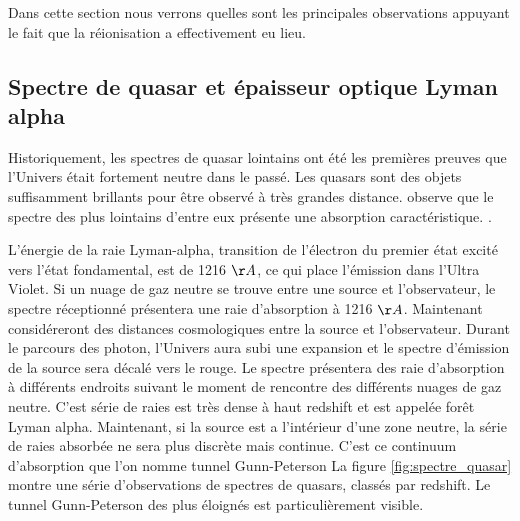 Dans cette section nous verrons quelles sont les principales observations appuyant le fait que la réionisation a effectivement eu lieu.

\subsection{Spectre de quasar et épaisseur optique Lyman alpha}

Historiquement, les spectres de quasar lointains ont été les premières preuves que l'Univers était fortement neutre dans le passé.
Les quasars sont des objets suffisamment brillants pour être observé à très grandes distance.
\cite{1965ApJ...141.1295S} observe que le spectre des plus lointains d'entre eux présente une absorption caractéristique.
.%

L'énergie de la raie Lyman-alpha, transition de l'électron du premier état excité vers l’état fondamental, est de 1216 $\AA$, ce qui place l’émission dans l'Ultra Violet.
Si un nuage de gaz neutre se trouve entre une source et l'observateur, le spectre réceptionné présentera une raie d'absorption à 1216 $\AA$.
Maintenant considéreront des distances cosmologiques entre la source et l'observateur.
Durant le parcours des photon, l'Univers aura subi une expansion et le spectre d'émission de la source sera décalé vers le rouge.
Le spectre présentera des raie d’absorption à différents endroits suivant le moment de rencontre des différents nuages de gaz neutre.
C'est série de raies est très dense à haut redshift et est appelée forêt Lyman alpha.
Maintenant, si la source est a l’intérieur d'une zone neutre, la série de raies absorbée ne sera plus discrète mais continue.
C'est ce continuum d’absorption que l'on nomme tunnel Gunn-Peterson \cite{1965ApJ...141.1295S}
La figure \ref{fig:spectre_quasar} montre une série d'observations de spectres de quasars, classés par redshift.
Le tunnel Gunn-Peterson des plus éloignés est particulièrement visible.


